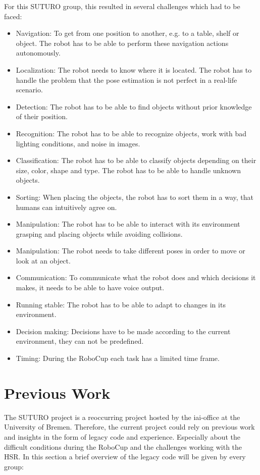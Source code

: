 \documentclass[main.tex]{subfiles}
\begin{document}
	For this SUTURO group, this resulted in several challenges which had to be faced:
	\begin{itemize}
		\item Navigation: To get from one position to another, e.g. to a table, shelf or object. The robot has to be able to perform these navigation actions autonomously.
		\item Localization: The robot needs to know where it is located. The robot has to handle the problem that the pose estimation is not perfect in a real-life scenario.
		\item Detection: The robot has to be able to find objects without prior knowledge of their position.
		\item Recognition: The robot has to be able to recognize objects, work with bad lighting conditions, and noise in images.
		\item Classification: The robot has to be able to classify objects depending on their size, color, shape and type. The robot has to be able to handle unknown objects.
		\item Sorting: When placing the objects, the robot has to sort them in a way, that humans can intuitively agree on.
		\item Manipulation: The robot has to be able to interact with its environment grasping and placing objects while avoiding collisions.
		\item Manipulation: The robot needs to take different poses in order to move or look at an object.
		\item Communication: To communicate what the robot does and which decisions it makes, it needs to be able to have voice output.
		\item Running stable: The robot has to be able to adapt to changes in its environment.
		\item Decision making: Decisions have to be made according to the current environment, they can not be predefined. 
		\item Timing: During the RoboCup each task has a limited time frame.
	\end{itemize}

	\section{Previous Work}
    \label{previous_work}
		The SUTURO project is a reoccurring project hosted by the iai-office at the University of Bremen. Therefore, the current project could rely on previous work and insights in the form of legacy code and experience. Especially about the difficult conditions during the RoboCup and the challenges working with the HSR. In this section a brief overview of the legacy code will be given by every group:
\end{document}
